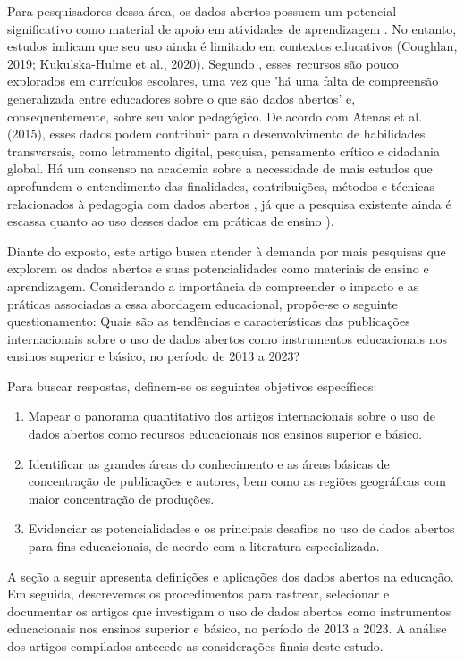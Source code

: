 \documentclass[portuguese]{textolivre}
\begin{document}
Para pesquisadores dessa área, os dados abertos possuem um potencial significativo como material de apoio em atividades de aprendizagem \cite{coughlan2019}. No entanto, estudos indicam que seu uso ainda é limitado em contextos educativos (Coughlan, 2019; Kukulska-Hulme et al., 2020). Segundo \textcite[p.~387]{coughlan2019}, esses recursos são pouco explorados em currículos escolares, uma vez que 'há uma falta de compreensão generalizada entre educadores sobre o que são dados abertos' e, consequentemente, sobre seu valor pedagógico. De acordo com Atenas et al. (2015), esses dados podem contribuir para o desenvolvimento de habilidades transversais, como letramento digital, pesquisa, pensamento crítico e cidadania global. Há um consenso na academia sobre a necessidade de mais estudos que aprofundem o entendimento das finalidades, contribuições, métodos e técnicas relacionados à pedagogia com dados abertos \cite{bhargava2015,wolff2015,buzato2018,lima-lopes2022,lima-lopes2023}, já que a pesquisa existente ainda é escassa quanto ao uso desses dados em práticas de ensino \cite{coughlan2019}).

Diante do exposto, este artigo busca atender à demanda por mais pesquisas que explorem os dados abertos e suas potencialidades como materiais de ensino e aprendizagem. Considerando a importância de compreender o impacto e as práticas associadas a essa abordagem educacional, propõe-se o seguinte questionamento: Quais são as tendências e características das publicações internacionais sobre o uso de dados abertos como instrumentos educacionais nos ensinos superior e básico, no período de 2013 a 2023?

Para buscar respostas, definem-se os seguintes objetivos específicos:

\begin{enumerate}
    \item Mapear o panorama quantitativo dos artigos internacionais sobre o uso de dados abertos como recursos educacionais nos ensinos superior e básico.
    \item Identificar as grandes áreas do conhecimento e as áreas básicas de concentração de publicações e autores, bem como as regiões geográficas com maior concentração de produções.
    \item Evidenciar as potencialidades e os principais desafios no uso de dados abertos para fins educacionais, de acordo com a literatura especializada.
\end{enumerate}

A seção a seguir apresenta definições e aplicações dos dados abertos na educação. Em seguida, descrevemos os procedimentos para rastrear, selecionar e documentar os artigos que investigam o uso de dados abertos como instrumentos educacionais nos ensinos superior e básico, no período de 2013 a 2023. A análise dos artigos compilados antecede as considerações finais deste estudo.
\end{document}
